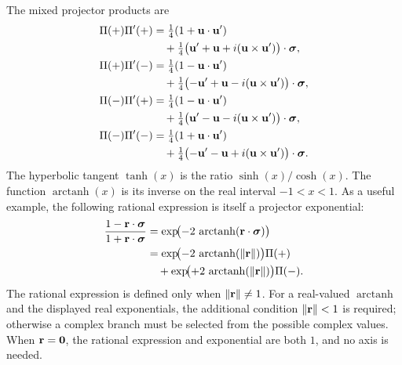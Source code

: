 The mixed projector products are
\begin{align*}
\Pi(+)\Pi'(+)
&= \tfrac14(1+\mathbf{u}\cdot\mathbf{u}')\notag\\
&\quad + \tfrac14\bigl(\mathbf{u}'+\mathbf{u}+i(\mathbf{u}\times\mathbf{u}')\bigr)\cdot\mathbf{\bm{\sigma}}, \\
\Pi(+)\Pi'(-)
&= \tfrac14(1-\mathbf{u}\cdot\mathbf{u}')\notag\\
&\quad + \tfrac14\bigl(-\mathbf{u}'+\mathbf{u}-i(\mathbf{u}\times\mathbf{u}')\bigr)\cdot\mathbf{\bm{\sigma}}, \\
\Pi(-)\Pi'(+)
&= \tfrac14(1-\mathbf{u}\cdot\mathbf{u}')\notag\\
&\quad + \tfrac14\bigl(\mathbf{u}'-\mathbf{u}-i(\mathbf{u}\times\mathbf{u}')\bigr)\cdot\mathbf{\bm{\sigma}}, \\
\Pi(-)\Pi'(-)
&= \tfrac14(1+\mathbf{u}\cdot\mathbf{u}')\notag\\
&\quad + \tfrac14\bigl(-\mathbf{u}'-\mathbf{u}+i(\mathbf{u}\times\mathbf{u}')\bigr)\cdot\mathbf{\bm{\sigma}}.
\end{align*}
The hyperbolic tangent \(\tanh(x)\) is the ratio
\(\sinh(x)/\cosh(x)\). The function \(\operatorname{arctanh}(x)\) is its
inverse on the real interval \(-1<x<1\). As a useful example, the following
rational expression is itself a projector exponential:
\begin{align*}
\frac{1-\mathbf{r}\cdot\mathbf{\bm{\sigma}}}{1+\mathbf{r}\cdot\mathbf{\bm{\sigma}}}
&= \exp\!\bigl(-2\,\operatorname{arctanh}(\mathbf{r}\cdot\mathbf{\bm{\sigma}})\bigr)\notag \\
&= \exp\!\bigl(-2\,\operatorname{arctanh}(\lVert\mathbf{r}\rVert)\bigr)\Pi(+)\notag \\
&\quad + \exp\!\bigl(+2\,\operatorname{arctanh}(\lVert\mathbf{r}\rVert)\bigr)\Pi(-).
\end{align*}
The rational expression is defined only when
\(\lVert\mathbf{r}\rVert\neq1\).
For a real-valued \(\operatorname{arctanh}\) and the displayed real
exponentials, the additional condition
\(\lVert\mathbf{r}\rVert<1\) is required; otherwise a complex branch must be
selected from the possible complex values. When \(\mathbf{r}=\mathbf{0}\), the
rational expression and exponential are both \(1\), and no axis is needed.

